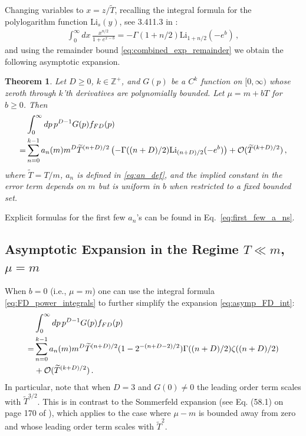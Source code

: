 \documentclass[sn-mathphys,Numbered]{sn-jnl}
\newtheorem{theorem}{Theorem}
\begin{document}
Changing variables to $x=z/\widetilde{T}$, recalling the integral formula for the polylogarithm function $\mathrm{Li}_s(y)$, see 3.411.3 in  \cite{Gradshteyn:1943cpj}:
\begin{align}\label{eq:h_decomp_eval}
   \int_0^\infty dx \, \frac{x^{n/2}}{1+e^{x-b}}    =-\Gamma(1+n/2)\mathrm{Li}_{1+n/2}(-e^b)\,,
\end{align}
and using the  remainder bound \eqref{eq:combined_exp_remainder} we obtain the following asymptotic expansion.
\begin{theorem}\label{thm:asymp_FD_int_Delta_mu_small}
Let $D\geq 0$, $k\in\mathbb{Z}^+$, and $G(p)$ be a  $C^k$ function on $[0,\infty)$ whose zeroth through $k$'th derivatives are polynomially bounded.  Let $\mu=m+bT$ for $b\geq 0$. Then
\begin{align}\label{eq:asymp_FD_int}
&\int_0^\infty dp\, p^{D-1} G(p) f_{FD}(p)\notag\\
   =&\sum_{n=0}^{k-1} a_n(m)m^{D}\widetilde{T}^{(n+D)/2}\left(-\Gamma((n+D)/2)\mathrm{Li}_{(n+D)/2}(-e^b)\right)+\mathcal{O}(\widetilde{T}^{(k+D)/2})\,,
\end{align}
where $\widetilde{T}=T/m$, $a_n$ is defined in \eqref{eq:an_def}, and the implied constant in the error term depends on $m$ but is uniform in $b$ when restricted to a fixed bounded set. 
\end{theorem}
Explicit formulas for the first few $a_n$'s can be found in Eq.~\eqref{eq:first_few_a_ns}.
\subsection{Asymptotic Expansion in the Regime $T\ll m$, $\mu=m$}\label{sec:b_0}
When $b=0$ (i.e., $\mu=m$) one can use the integral formula \eqref{eq:FD_power_integrals} to further simplify the expansion \eqref{eq:asymp_FD_int}:
\begin{align}\label{eq:asymp_FD_int_b_0}
&\int_0^\infty dp\, p^{D-1} G(p) f_{FD}(p)\notag\\
   =&\sum_{n=0}^{k-1} a_n(m)m^{D}\widetilde{T}^{(n+D)/2}(1-2^{-(n+D-2)/2})\Gamma((n+D)/2)\zeta((n+D)/2)\\
   &+\mathcal{O}(\widetilde{T}^{(k+D)/2})\,.\notag
\end{align}
In particular, note that when $D=3$ and $G(0)\neq 0$ the leading order term scales with $\widetilde{T}^{3/2}$.  This is in contrast to the  Sommerfeld expansion (see Eq. (58.1) on page 170 of \cite{landau2013statistical}), which  applies to the case where $\mu-m$ is bounded away from zero and whose leading order term scales with $\widetilde{T}^2$.
\end{document}

